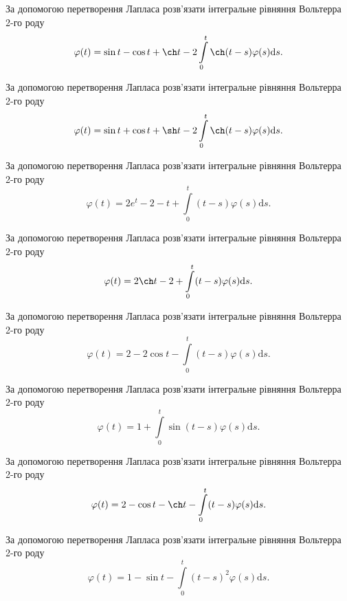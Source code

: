 \documentclass[12pt]{extarticle}
\begin{document}
\begin{Exercise}
За допомогою перетворення Лапласа розв’язати інтегральне рівняння Вольтерра 2-го роду \[\varphi(t) = \sin t - \cos t + \ch t - 2\int\limits_{0}^{t} \ch (t-s) \varphi(s) \mathrm{d}s.\]
\end{Exercise}

\begin{Exercise}
За допомогою перетворення Лапласа розв’язати інтегральне рівняння Вольтерра 2-го роду \[\varphi(t) = \sin t + \cos t + \sh t - 2\int\limits_{0}^{t} \ch (t-s) \varphi(s) \mathrm{d}s.\]
\end{Exercise}

\begin{Exercise}
За допомогою перетворення Лапласа розв’язати інтегральне рівняння Вольтерра 2-го роду \[\varphi(t) = 2 e^t - 2 - t + \int\limits_{0}^{t} (t - s) \varphi(s) \mathrm{d}s.\]
\end{Exercise}

\begin{Exercise}
За допомогою перетворення Лапласа розв’язати інтегральне рівняння Вольтерра 2-го роду \[\varphi(t) = 2 \ch t - 2 + \int\limits_{0}^{t} (t - s) \varphi(s) \mathrm{d}s.\]
\end{Exercise}

\begin{Exercise}
За допомогою перетворення Лапласа розв’язати інтегральне рівняння Вольтерра 2-го роду \[\varphi(t) = 2 - 2\cos t - \int\limits_{0}^{t} (t - s) \varphi(s) \mathrm{d}s.\]
\end{Exercise}

\begin{Exercise}
За допомогою перетворення Лапласа розв’язати інтегральне рівняння Вольтерра 2-го роду \[\varphi(t) = 1 + \int\limits_{0}^{t} \sin (t - s) \varphi(s) \mathrm{d}s.\]
\end{Exercise}

\begin{Exercise}
За допомогою перетворення Лапласа розв’язати інтегральне рівняння Вольтерра 2-го роду \[\varphi(t) = 2 - \cos t - \ch t - \int\limits_{0}^{t} (t - s) \varphi(s) \mathrm{d}s.\]
\end{Exercise}

\begin{Exercise}
За допомогою перетворення Лапласа розв’язати інтегральне рівняння Вольтерра 2-го роду \[\varphi(t) = 1 - \sin t - \int\limits_{0}^{t} (t - s)^2 \varphi(s) \mathrm{d}s.\]
\end{Exercise}
\end{document}
